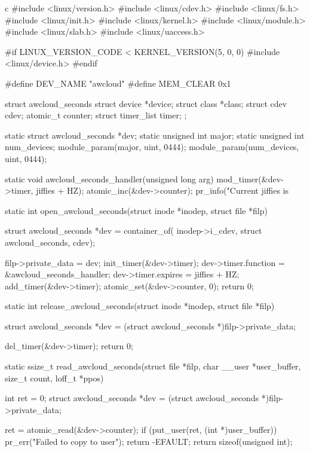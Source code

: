 \begin{code-block}{c}
#include <linux/version.h>
#include <linux/cdev.h>
#include <linux/fs.h>
#include <linux/init.h>
#include <linux/kernel.h>
#include <linux/module.h>
#include <linux/slab.h>
#include <linux/uaccess.h>

#if LINUX_VERSION_CODE < KERNEL_VERSION(5, 0, 0)
#include <linux/device.h>
#endif

#define DEV_NAME "awcloud"
#define MEM_CLEAR 0x1

struct awcloud_seconds {
        struct device        *device;
        struct class         *class;
        struct cdev          cdev;
        atomic_t             counter;
        struct timer_list    timer;
};

static struct awcloud_seconds *dev;
static unsigned int major;
static unsigned int num_devices;
module_param(major, uint, 0444);
module_param(num_devices, uint, 0444);

static void awcloud_seconds_handler(unsigned long arg)
{
        mod_timer(&dev->timer, jiffies + HZ);
        atomic_inc(&dev->counter);
        pr_info("Current jiffies is %
}

static int open_awcloud_seconds(struct inode *inodep, struct file *filp)
{
        struct awcloud_seconds *dev = container_of(
                inodep->i_cdev, struct awcloud_seconds, cdev);

        filp->private_data = dev;
        init_timer(&dev->timer);
        dev->timer.function = &awcloud_seconds_handler;
        dev->timer.expires = jiffies + HZ;
        add_timer(&dev->timer);
        atomic_set(&dev->counter, 0);
        return 0;
}

static int release_awcloud_seconds(struct inode *inodep, struct file *filp)
{

        struct awcloud_seconds *dev =
                (struct awcloud_seconds *)filp->private_data;

        del_timer(&dev->timer);
        return 0;
}

static ssize_t read_awcloud_seconds(struct file *filp,
        char __user *user_buffer, size_t count, loff_t *ppos)
{
        int ret = 0;
        struct awcloud_seconds *dev =
                (struct awcloud_seconds *)filp->private_data;

        ret = atomic_read(&dev->counter);
        if (put_user(ret, (int *)user_buffer)) {
                pr_err("Failed to copy to user\n");
                return -EFAULT;
        }
        return sizeof(unsigned int);
}


\end{code-block}
